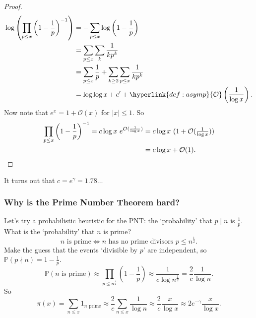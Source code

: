 \documentclass{article}
\newcommand{\1}{\mathbbm{1}}
\newcommand{\bigO}{\mathcal{O}}
\begin{document}
\begin{proof}
  \begin{align*}
    \log \left(\prod_{p \leq x} \left(1 - \frac{1}{p}\right)^{-1}\right) &= - \sum_{p \leq x} \log \left(1 - \frac{1}{p}\right) \\
                                                                         &= \sum_{p \leq x} \sum_{k} \frac{1}{k p^k} \\
                                                                         &= \sum_{p \leq x} \frac 1p + \sum_{k \geq 2} \sum_{p \leq x} \frac{1}{k p^k} \\
                                                                         &= \log \log x + c' + \hyperlink{def:asymp}{\bigO}\left(\frac{1}{\log x}\right).
  \end{align*}
  Now note that $e^x = 1 + \bigO(x)$ for $|x| \leq 1$.
  So
  \begin{align*}
    \prod_{p \leq x} \left(1 - \frac{1}{p}\right)^{-1} = c \log x\ e^{\bigO(\frac{1}{\log x})} &= c \log x\ (1 + \bigO(\tfrac{1}{\log x})) \\
                                                                                            &= c \log x + \bigO(1). \qedhere
  \end{align*}
\end{proof}
It turns out that $c = e^\gamma = 1.78\dots$

\subsubsection{Why is the Prime Number Theorem hard?}
Let's try a probabilistic heuristic for the PNT: the `probability' that $p \mid n$ is $\frac{1}{p}$.
What is the `probability' that $n$ is prime?
\begin{equation*}
  n\text{ is prime} \iff n\text{ has no prime divisors } p \leq n^{\frac{1}{2}}.
\end{equation*}
Make the guess that the events `divisible by $p$' are independent, so $\mathbb{P}(p \nmid n) = 1 - \frac{1}{p}$.
\begin{equation*}
  \mathbb{P}(n \text{ is prime}) \approx \prod_{p \leq n^{\frac{1}{2}}} \left(1 - \frac{1}{p}\right) \approx \frac{1}{c \log n^{\frac{1}{2}}} = \frac{2}{c} \frac{1}{\log n}.
\end{equation*}
So
\begin{equation*}
\pi(x) = \sum_{n \leq x} 1_{n \text{ prime}} \approx \frac{2}{c} \sum_{n \leq x} \frac{1}{\log n} \approx \frac{2}{c} \frac{x}{\log x} \approx 2 e^{-\gamma} \frac{x}{\log x}.
\end{equation*}
\end{document}
